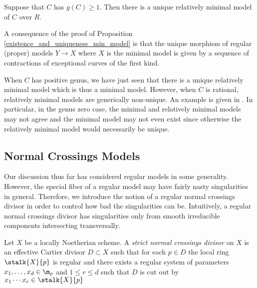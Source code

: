 \begin{proposition}
Suppose that $C$ has $g(C) \ge 1$. Then there is a unique relatively minimal model of $C$ over $R$.
\end{proposition}

\begin{rmk}
A consequence of the proof of Proposition \ref{existence_and_uniqueness_min_model} is that the unique morphism of regular (proper) models $Y \to X$ where $X$ is the minimal model is given by a sequence of contractions of exceptional curves of the first kind.
\end{rmk}

\begin{rmk}
When $C$ has positive genus, we have just seen that there is a unique relatively minimal model which is thus a minimal model. However, when $C$ is rational, relatively minimal models are generically non-unique. An example is given in \cite[\href{https://stacks.math.columbia.edu/tag/0CA0}{Tag 0CA0}]{stacks-project}. In particular, in the genus zero case, the minimal and relatively minimal models may not agree and the minimal model may not even exist since otherwise the relatively minimal model would necessarily be unique. 
\end{rmk}

\subsection{Normal Crossings Models}

Our discussion thus far has considered regular models in some generality. However, the special fiber of a regular model may have fairly nasty singularities in general. Therefore, we introduce the notion of a regular normal crossings divisor in order to control how bad the singularities can be. Intuitively, a regular normal crossings divisor has singularities only from smooth irreducible components intersecting transversally.

\begin{definition}
Let $X$ be a locally Noetherian scheme. A \textit{strict normal crossings divisor} on $X$ is an effective Cartier divisor $D \subset X$ such that for each $p \in D$ the local ring $\stalk{X}{p}$ is regular and there exists a regular system of parameters $x_1, \dots, x_d \in \m_p$ and $1 \le r \le d$ such that $D$ is cut out by $x_1 \cdots x_r \in \stalk{X}{p}$ 
\end{definition}

